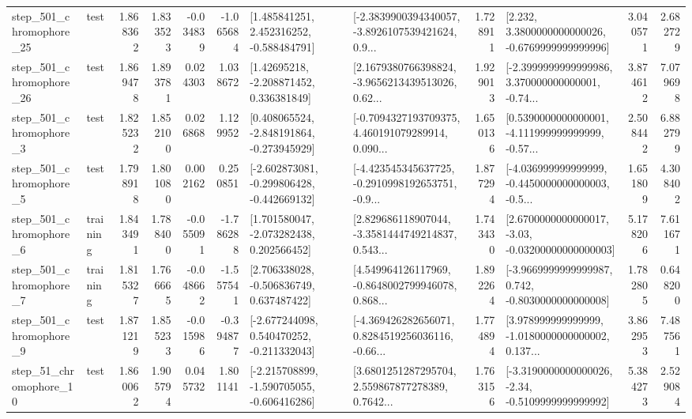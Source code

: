 \begin{tabular}{llrrrrllrlrr}
  step\_501\_chromophore\_25 &      test &      1.868362 &    1.833523 &     -0.034839 & -1.065684 &    [1.485841251, 2.452316252, -0.588484791] &  [-2.3839900394340057, -3.8926107539421624, 0.9... &       1.728911 &   [2.232, 3.3800000000000026, -0.6769999999999996] &            3.040571 &          2.682729 \\
  step\_501\_chromophore\_26 &      test &      1.869478 &    1.893781 &      0.024303 &  1.038672 &     [1.42695218, -2.208871452, 0.336381849] &  [2.1679380766398824, -3.9656213439513026, 0.62... &       1.929013 &  [-2.3999999999999986, 3.370000000000001, -0.74... &            3.874612 &          7.079698 \\
   step\_501\_chromophore\_3 &      test &      1.825232 &    1.852100 &      0.026868 &  1.129952 &   [0.408065524, -2.848191864, -0.273945929] &  [-0.7094327193709375, 4.460191079289914, 0.090... &       1.650136 &  [0.5390000000000001, -4.111999999999999, -0.57... &            2.508442 &          6.882799 \\
   step\_501\_chromophore\_5 &      test &      1.798918 &    1.801080 &      0.002162 &  0.250851 &  [-2.602873081, -0.299806428, -0.442669132] &  [-4.423545345637725, -0.2910998192653751, -0.9... &       1.877294 &  [-4.036999999999999, -0.4450000000000003, -0.5... &            1.651809 &          4.308402 \\
   step\_501\_chromophore\_6 &  training &      1.843491 &    1.788400 &     -0.055091 & -1.786288 &    [1.701580047, -2.073282438, 0.202566452] &  [2.829686118907044, -3.3581444749214837, 0.543... &       1.743430 &  [2.6700000000000017, -3.03, -0.03200000000000003] &            5.178206 &          7.611671 \\
   step\_501\_chromophore\_7 &  training &      1.815327 &    1.766665 &     -0.048662 & -1.557541 &    [2.706338028, -0.506836749, 0.637487422] &  [4.549964126117969, -0.8648002799946078, 0.868... &       1.892264 &  [-3.9669999999999987, 0.742, -0.8030000000000008] &            1.782805 &          0.648200 \\
   step\_501\_chromophore\_9 &      test &      1.871219 &    1.855233 &     -0.015986 & -0.394877 &   [-2.677244098, 0.540470252, -0.211332043] &  [-4.369426282656071, 0.8284519256036116, -0.66... &       1.774894 &  [3.978999999999999, -1.0180000000000002, 0.137... &            3.862953 &          7.487561 \\
   step\_51\_chromophore\_10 &      test &      1.860062 &    1.905794 &      0.045732 &  1.801141 &  [-2.215708899, -1.590705055, -0.606416286] &  [3.6801251287295704, 2.559867877278389, 0.7642... &       1.763156 &  [-3.3190000000000026, -2.34, -0.5109999999999992] &            5.384273 &          2.529084 \\

\end{tabular}
